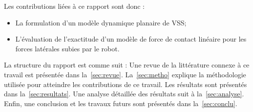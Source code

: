 Les contributions liées à ce rapport sont donc :
\begin{itemize}
	\item La formulation d'un modèle dynamique planaire de \ac{VSS};
	\item L'évaluation de l'exactitude d'un modèle de force de contact linéaire pour les forces latérales subies par le robot.
\end{itemize}
La structure du rapport est comme suit :
Une revue de la littérature connexe à ce travail est présentée dans la~\autoref{sec:revue}.
La~\autoref{sec:metho} explique la méthodologie utilisée pour atteindre les contributions de ce travail.
Les résultats sont présentés dans la~\autoref{sec:resultats}.
Une analyse détaillée des résultats suit à la~\autoref{sec:analyse}.
Enfin, une conclusion et les travaux futurs sont présentés dans la~\autoref{sec:conclu}.